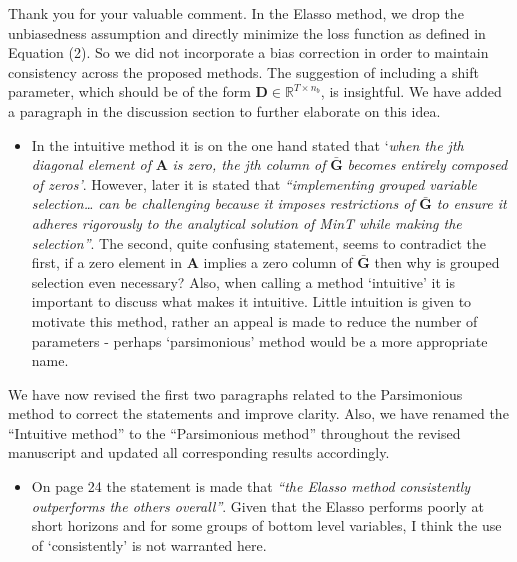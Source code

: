 \documentclass[11pt,a4paper,]{article}
\providecommand{\tightlist}{%
  \setlength{\itemsep}{0pt}\setlength{\parskip}{0pt}}
\renewenvironment{quote}
               {\list{}{\rightmargin\leftmargin}%
                \item\relax\color[RGB]{0,150,0}}
               {\endlist}
\begin{document}
\begin{quote}
Thank you for your valuable comment. In the Elasso method, we drop the
unbiasedness assumption and directly minimize the loss function as
defined in Equation (2). So we did not incorporate a bias correction in
order to maintain consistency across the proposed methods. The
suggestion of including a shift parameter, which should be of the form
\(\bm{D} \in \mathbb{R}^{T \times n_b}\), is insightful. We have added a
paragraph in the discussion section to further elaborate on this idea.
\end{quote}

\begin{itemize}
\tightlist
\item
  In the intuitive method it is on the one hand stated that `\emph{when
  the jth diagonal element of} \(\bm{A}\) \emph{is zero, the jth column
  of} \(\bar{\bm{G}}\) \emph{becomes entirely composed of zeros'}.
  However, later it is stated that \emph{``implementing grouped variable
  selection\ldots{} can be challenging because it imposes restrictions
  of} \(\bar{\bm{G}}\) \emph{to ensure it adheres rigorously to the
  analytical solution of MinT while making the selection''}. The second,
  quite confusing statement, seems to contradict the first, if a zero
  element in \(\bm{A}\) implies a zero column of \(\bar{\bm{G}}\) then
  why is grouped selection even necessary? Also, when calling a method
  `intuitive' it is important to discuss what makes it intuitive. Little
  intuition is given to motivate this method, rather an appeal is made
  to reduce the number of parameters - perhaps `parsimonious' method
  would be a more appropriate name.
\end{itemize}

\begin{quote}
We have now revised the first two paragraphs related to the Parsimonious
method to correct the statements and improve clarity. Also, we have
renamed the ``Intuitive method'' to the ``Parsimonious method''
throughout the revised manuscript and updated all corresponding results
accordingly.
\end{quote}

\begin{itemize}
\tightlist
\item
  On page 24 the statement is made that \emph{``the Elasso method
  consistently outperforms the others overall''}. Given that the Elasso
  performs poorly at short horizons and for some groups of bottom level
  variables, I think the use of `consistently' is not warranted here.
\end{itemize}
\end{document}
